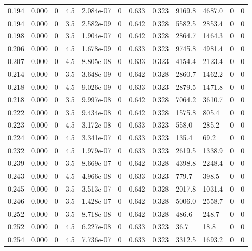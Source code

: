 \documentclass[preview]{standalone}
\begin{document}
{{{\begin{tabular}{L{1.2cm}C{1.2cm} C{0.3cm}C{0.5cm} C{1.4cm}C{1.4cm} C{1.4cm}C{1.4cm} C{1.6cm}C{1.6cm} C{1.6cm}C{1.6cm}}
  0.194  &  0.000  & 0     & 4.5 &  2.084e-07  & 0  &  0.633&   0.323& 9169.8 & 4687.0   &  0 & 0  \\ 
  0.194  &  0.000  & 0     & 3.5 &  2.582e-09  & 0  &  0.642&   0.328& 5582.5 & 2853.4   &  0 & 0  \\ 
  0.198  &  0.000  & 0     & 3.5 &  1.904e-07  & 0  &  0.642&   0.328& 2864.7 & 1464.3   &  0 & 0  \\ 
  0.206  &  0.000  & 0     & 4.5 &  1.678e-09  & 0  &  0.633&   0.323& 9745.8 & 4981.4   &  0 & 0  \\ 
  0.207  &  0.000  & 0     & 4.5 &  8.805e-08  & 0  &  0.633&   0.323& 4154.4 & 2123.4   &  0 & 0  \\ 
  0.214  &  0.000  & 0     & 3.5 &  3.648e-09  & 0  &  0.642&   0.328& 2860.7 & 1462.2   &  0 & 0  \\ 
  0.218  &  0.000  & 0     & 4.5 &  9.026e-09  & 0  &  0.633&   0.323& 2879.5 & 1471.8   &  0 & 0  \\ 
  0.218  &  0.000  & 0     & 3.5 &  9.997e-08  & 0  &  0.642&   0.328& 7064.2 & 3610.7   &  0 & 0  \\ 
  0.222  &  0.000  & 0     & 3.5 &  9.434e-08  & 0  &  0.642&   0.328& 1575.8 & 805.4   &  0 & 0  \\ 
  0.223  &  0.000  & 0     & 4.5 &  3.172e-08  & 0  &  0.633&   0.323& 558.0 & 285.2   &  0 & 0  \\ 
  0.224  &  0.000  & 0     & 4.5 &  3.341e-07  & 0  &  0.633&   0.323& 135.4 & 69.2   &  0 & 0  \\ 
  0.232  &  0.000  & 0     & 4.5 &  1.979e-07  & 0  &  0.633&   0.323& 2619.5 & 1338.9   &  0 & 0  \\ 
  0.239  &  0.000  & 0     & 3.5 &  8.669e-07  & 0  &  0.642&   0.328& 4398.8 & 2248.4   &  0 & 0  \\ 
  0.243  &  0.000  & 0     & 4.5 &  4.966e-08  & 0  &  0.633&   0.323& 779.7 & 398.5   &  0 & 0  \\ 
  0.245  &  0.000  & 0     & 3.5 &  3.513e-07  & 0  &  0.642&   0.328& 2017.8 & 1031.4   &  0 & 0  \\ 
  0.246  &  0.000  & 0     & 3.5 &  1.428e-07  & 0  &  0.642&   0.328& 5006.0 & 2558.7   &  0 & 0  \\ 
  0.252  &  0.000  & 0     & 3.5 &  8.718e-08  & 0  &  0.642&   0.328& 486.6 & 248.7   &  0 & 0  \\ 
  0.252  &  0.000  & 0     & 4.5 &  6.227e-08  & 0  &  0.633&   0.323& 36.7 & 18.8   &  0 & 0  \\ 
  0.254  &  0.000  & 0     & 4.5 &  7.736e-07  & 0  &  0.633&   0.323& 3312.5 & 1693.2   &  0 & 0  \\ 

\end{tabular}}}}
\end{document}
